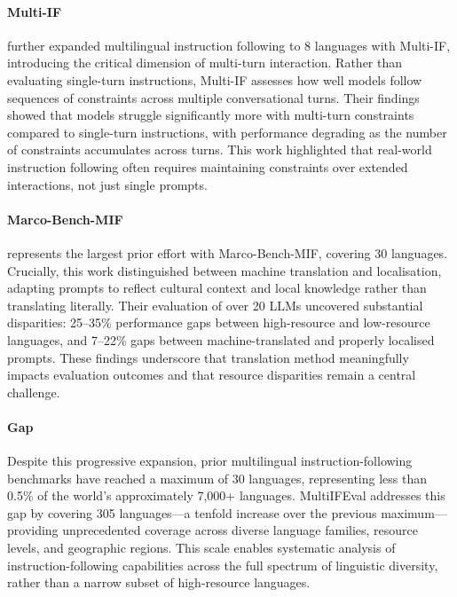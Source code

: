 \documentclass[11pt]{article}
\begin{document}
\paragraph{Multi-IF}
\cite{he2024multi} further expanded multilingual instruction following to 8 languages with Multi-IF, introducing the critical dimension of multi-turn interaction. Rather than evaluating single-turn instructions, Multi-IF assesses how well models follow sequences of constraints across multiple conversational turns. Their findings showed that models struggle significantly more with multi-turn constraints compared to single-turn instructions, with performance degrading as the number of constraints accumulates across turns. This work highlighted that real-world instruction following often requires maintaining constraints over extended interactions, not just single prompts.

\paragraph{Marco-Bench-MIF}
\cite{zeng-etal-2025-marco} represents the largest prior effort with Marco-Bench-MIF, covering 30 languages. Crucially, this work distinguished between machine translation and localisation, adapting prompts to reflect cultural context and local knowledge rather than translating literally. Their evaluation of over 20 LLMs uncovered substantial disparities: 25--35\% performance gaps between high-resource and low-resource languages, and 7--22\% gaps between machine-translated and properly localised prompts. These findings underscore that translation method meaningfully impacts evaluation outcomes and that resource disparities remain a central challenge.

\paragraph{Gap}
Despite this progressive expansion, prior multilingual instruction-following benchmarks have reached a maximum of 30 languages, representing less than 0.5\% of the world's approximately 7,000+ languages. MultiIFEval addresses this gap by covering 305 languages---a tenfold increase over the previous maximum---providing unprecedented coverage across diverse language families, resource levels, and geographic regions. This scale enables systematic analysis of instruction-following capabilities across the full spectrum of linguistic diversity, rather than a narrow subset of high-resource languages.
\end{document}
